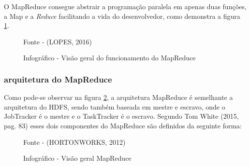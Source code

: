 O MapReduce consegue abstrair a programação paralela em apenas duas funções, a Map e a \textit{Reduce} facilitando a vida do desenvolvedor, como demonstra a figura \ref{Fig:Estrutura Mapreduce01}.

\begin{figure}[htbp!] \begin{center}
\caption{Infográfico - Visão geral do funcionamento do MapReduce }
\small{Fonte - (LOPES, 2016)}
\label{Fig:Estrutura Mapreduce01}
\end{center} \end{figure}


\subsubsection{arquitetura do MapReduce}

Como pode-se observar na figura \ref{Fig:Estrutura MapReduce02}, a arquitetura MapReduce é semelhante a arquitetura do HDFS, sendo também baseada em mestre e escravo, onde o JobTracker é o mestre e o TaskTracker é o escravo. Segundo Tom White (2015, pag. 83) esses dois componentes do MapReduce são definidos da seguinte forma:


\begin{figure}[htbp!] \begin{center}
\caption{Infográfico - Visão geral MapReduce }
\small{Fonte - (HORTONWORKS, 2012)}
\label{Fig:Estrutura MapReduce02}
\end{center} \end{figure}


